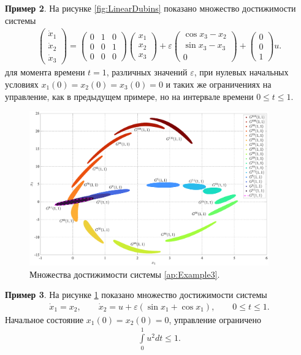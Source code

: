 \documentclass[../main.tex]{subfiles}
\begin{document}
 	 \textbf{Пример 2}. На рисунке \ref{fig:LinearDubins} показано множество достижимости системы 
 \begin{gather}\label{ap:Linear+Dubins}
 	\begin{pmatrix} 
 		\dot{x}_1 \\
 		\dot{x}_2 \\ 
 		\dot{x}_3 \end{pmatrix} = 
 	\begin{pmatrix}
 		0 & 1 & 0 \\
 		0 & 0 & 1 \\
 		0 & 0 & 0
 	\end{pmatrix}
 	\begin{pmatrix} 
 		x_1 \\
 		x_2 \\ 
 		x_3 \end{pmatrix} + 
 	\varepsilon
 	\begin{pmatrix}
 		\cos x_3 - x_2\\
 		\sin x_3 - x_3 \\
 		0
 	\end{pmatrix} + 
 	\begin{pmatrix}
 		0 \\ 0 \\ 1
 	\end{pmatrix} u.
 \end{gather}
 	для момента времени $t = 1$, различных значений $\varepsilon$, при нулевых начальных условиях $x_1(0) = x_2(0) = x_3(0) = 0 $ и таких же ограничениях на управление, как в предыдущем примере, но на интервале времени $0 \leqslant t \leqslant 1$.
 	
 	\begin{figure}[t]
 		\centering
 			\includegraphics[width=0.92\textwidth]{images/Osipov_QuaziLinearExp.eps}
 		\caption{Множества достижимости системы \eqref{ap:Example3}.}
 		\label{ap:fig:QuaziLinearExp}
 	\end{figure}
 
 \textbf{Пример 3}. На рисунке \ref{ap:fig:QuaziLinearExp} показано множество достижимости системы 
 \begin{gather}\label{ap:Example3}
 	\dot{x}_1 = x_2, \qquad
 	\dot{x}_2 = u + \varepsilon(\sin x_1 + \cos x_1),\qquad 0\leqslant t \leqslant 1.
 \end{gather}
 Начальное состояние $x_1(0) = x_2(0) = 0 $, управление ограничено 
 \begin{gather}\label{example3_controls}
 	\int\limits_0^1 u^2dt \leqslant 1.
 \end{gather}
 
\end{document}
